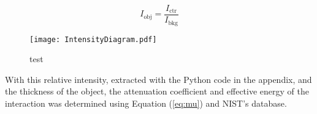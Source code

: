 \begin{equation}
    I_{\text{obj}} = \frac{I_{\text{ctr}}}{I_{\text{bkg}}}
	\label{eq:IObj}
\end{equation}

\begin{figure}[H]
    \centering
	\texttt{[image: IntensityDiagram.pdf]}
	\caption{test}
	\label{figure:IntensityDiagram}
\end{figure}

With this relative intensity, extracted with the Python code in the appendix, and the thickness of the object, the attenuation coefficient and effective energy of the interaction was determined using Equation (\ref{eq:mu}) and NIST's database.